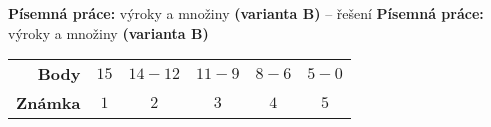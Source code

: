 \begin{center}
\ifprintanswers
    \large \textbf{Písemná práce:} výroky a množiny \textbf{(varianta B)} -- řešení
\else
    \large \textbf{Písemná práce:} výroky a množiny \textbf{(varianta B)}

    \normalsize
    \qquad
    \qquad
    \end{center}

    \begin{table}[h]
        \scriptsize
        \centering
        \begin{tabular}{rccccc}
            \toprule
            \textbf{Body} & $15$ & $14-12$ & $11-9$ & $8-6$ & $5-0$ \\ 
            \textbf{Známka} & $1$ & $2$ & $3$ & $4$ & $5$ \\ 
            \bottomrule
        \end{tabular}
    \end{table}
\fi

